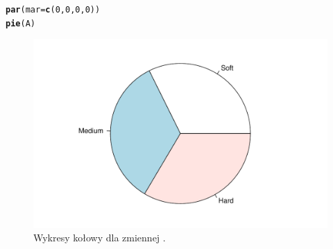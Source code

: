 \documentclass[12pt]{mwart}\usepackage[]{graphicx}\usepackage[]{color}
\makeatletter
\def\maxwidth{ %
  \ifdim\Gin@nat@width>\linewidth
    \linewidth
  \else
    \Gin@nat@width
  \fi
}
\newcommand{\hlnum}[1]{\textcolor[rgb]{0.686,0.059,0.569}{#1}}%
\newcommand{\hlstd}[1]{\textcolor[rgb]{0.345,0.345,0.345}{#1}}%
\newcommand{\hlkwc}[1]{\textcolor[rgb]{0.333,0.667,0.333}{#1}}%
\newcommand{\hlkwd}[1]{\textcolor[rgb]{0.737,0.353,0.396}{\textbf{#1}}}%
\newenvironment{kframe}{%
 \def\at@end@of@kframe{}%
 \ifinner\ifhmode%
  \def\at@end@of@kframe{\end{minipage}}%
  \begin{minipage}{\columnwidth}%
 \fi\fi%
 \def\FrameCommand##1{\hskip\@totalleftmargin \hskip-\fboxsep
 \colorbox{shadecolor}{##1}\hskip-\fboxsep
     \hskip-\linewidth \hskip-\@totalleftmargin \hskip\columnwidth}%
 \MakeFramed {\advance\hsize-\width
   \@totalleftmargin\z@ \linewidth\hsize
   \@setminipage}}%
 {\par\unskip\endMakeFramed%
 \at@end@of@kframe}
\newenvironment{knitrout}{}{} %
\makeatother
\begin{document}
\begin{knitrout}
\color{fgcolor}\begin{kframe}
\begin{alltt}
\hlkwd{par}\hlstd{(}\hlkwc{mar} \hlstd{=} \hlkwd{c}\hlstd{(}\hlnum{0}\hlstd{,}\hlnum{0}\hlstd{,}\hlnum{0}\hlstd{,}\hlnum{0}\hlstd{))}
\hlkwd{pie}\hlstd{(A)}
\end{alltt}
\end{kframe}\begin{figure}[H]
\includegraphics[width=\maxwidth]{figure/fig_2-1} \caption{\label{fig:2}Wykresy kołowy dla zmiennej .}\label{fig:fig_2}
\end{figure}

\end{knitrout}
\end{document}
